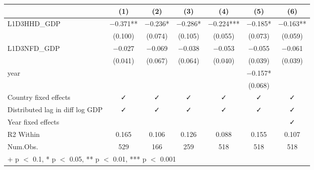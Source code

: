 \begin{table}
\centering
\begin{tabular}[t]{lcccccc}
\toprule
  & (1) & (2) & (3) & (4) & (5) & (6)\\
\midrule
L1D3HHD\_GDP & \num{-0.371}** & \num{-0.236}* & \num{-0.286}* & \num{-0.224}*** & \num{-0.185}* & \num{-0.163}**\\
 & (\num{0.100}) & (\num{0.074}) & (\num{0.105}) & (\num{0.055}) & (\num{0.073}) & (\num{0.059})\\
L1D3NFD\_GDP & \num{-0.027} & \num{-0.069} & \num{-0.038} & \num{-0.053} & \num{-0.055} & \num{-0.061}\\
 & (\num{0.041}) & (\num{0.067}) & (\num{0.064}) & (\num{0.040}) & (\num{0.039}) & (\num{0.039})\\
year &  &  &  &  & \num{-0.157}* & \\
 &  &  &  &  & (\num{0.068}) & \\
\midrule
Country fixed effects & ✓ & ✓ & ✓ & ✓ & ✓ & ✓\\
Distributed lag in diff log GDP & ✓ & ✓ & ✓ & ✓ & ✓ & ✓\\
Year fixed effects &  &  &  &  &  & ✓\\
R2 Within & \num{0.165} & \num{0.106} & \num{0.126} & \num{0.088} & \num{0.155} & \num{0.107}\\
Num.Obs. & \num{529} & \num{166} & \num{259} & \num{518} & \num{518} & \num{518}\\
\bottomrule
\multicolumn{7}{l}{\rule{0pt}{1em}+ p $<$ 0.1, * p $<$ 0.05, ** p $<$ 0.01, *** p $<$ 0.001}\\
\end{tabular}
\end{table}
